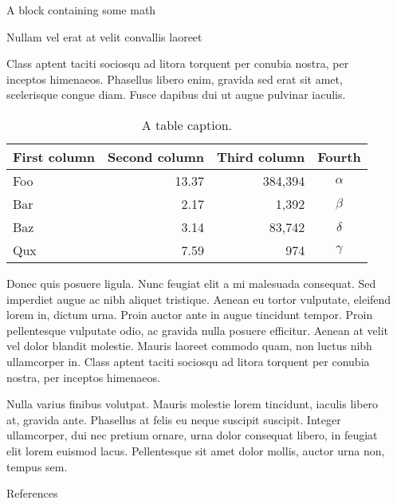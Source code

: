 \documentclass[final]{beamer}
\newlength{\sepwidth}
\newlength{\colwidth}
\newcommand{\separatorcolumn}{\begin{column}{\sepwidth}\end{column}}
\begin{document}
\begin{frame}[t]
\begin{columns}[t]
\begin{column}{\colwidth}
\begin{block}{A block containing some math}
  \end{block}

  \begin{block}{Nullam vel erat at velit convallis laoreet}

    Class aptent taciti sociosqu ad litora torquent per conubia nostra, per
    inceptos himenaeos. Phasellus libero enim, gravida sed erat sit amet,
    scelerisque congue diam. Fusce dapibus dui ut augue pulvinar iaculis.

    \begin{table}
      \centering
      \begin{tabular}{l r r c}
        \toprule
        \textbf{First column} & \textbf{Second column} & \textbf{Third column} & \textbf{Fourth} \\
        \midrule
        Foo & 13.37 & 384,394 & $\alpha$ \\
        Bar & 2.17 & 1,392 & $\beta$ \\
        Baz & 3.14 & 83,742 & $\delta$ \\
        Qux & 7.59 & 974 & $\gamma$ \\
        \bottomrule
      \end{tabular}
      \caption{A table caption.}
    \end{table}

    Donec quis posuere ligula. Nunc feugiat elit a mi malesuada consequat. Sed
    imperdiet augue ac nibh aliquet tristique. Aenean eu tortor vulputate,
    eleifend lorem in, dictum urna. Proin auctor ante in augue tincidunt
    tempor. Proin pellentesque vulputate odio, ac gravida nulla posuere
    efficitur. Aenean at velit vel dolor blandit molestie. Mauris laoreet
    commodo quam, non luctus nibh ullamcorper in. Class aptent taciti sociosqu
    ad litora torquent per conubia nostra, per inceptos himenaeos.

    Nulla varius finibus volutpat. Mauris molestie lorem tincidunt, iaculis
    libero at, gravida ante. Phasellus at felis eu neque suscipit suscipit.
    Integer ullamcorper, dui nec pretium ornare, urna dolor consequat libero,
    in feugiat elit lorem euismod lacus. Pellentesque sit amet dolor mollis,
    auctor urna non, tempus sem.

  \end{block}

  \begin{block}{References}

    \nocite{*}
    \footnotesize{}

  \end{block}

\end{column}

\separatorcolumn
\end{columns}
\end{frame}
\end{document}
